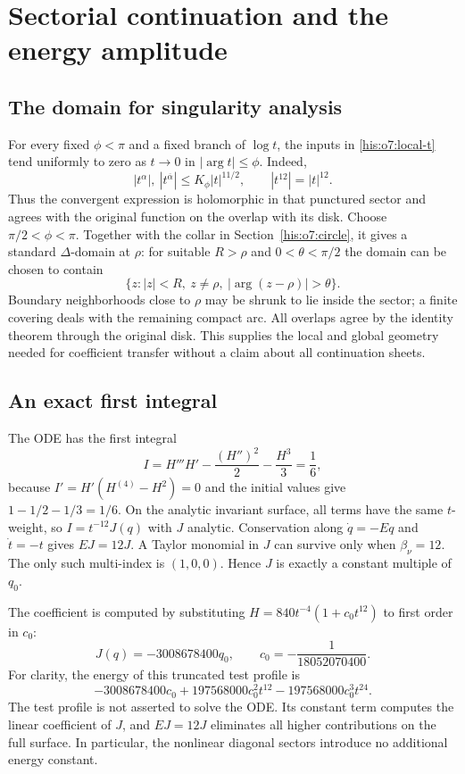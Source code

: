 \documentclass[11pt]{article}
\theoremstyle{remark}\newtheorem{remark}[theorem]{Remark}
\newcommand{\ba}{\overline\alpha}
\numberwithin{equation}{section}
\begin{document}
\section{Sectorial continuation and the energy amplitude}\label{his:o7:sector}
\subsection{The domain for singularity analysis}
For every fixed $\phi<\pi$ and a fixed branch of $\log t$, the
inputs in \eqref{his:o7:local-t} tend uniformly to zero as $t\to0$ in
$|\arg t|\le\phi$. Indeed,
\[
|t^\alpha|,\ |t^{\ba}|\le K_\phi |t|^{11/2},\qquad
|t^{12}|=|t|^{12}.
\]
Thus the convergent expression is holomorphic in that punctured
sector and agrees with the original function on the overlap with
its disk. Choose $\pi/2<\phi<\pi$. Together with the collar in
Section~\ref{his:o7:circle}, it gives a standard $\Delta$-domain at $\rho$:
for suitable $R>\rho$ and $0<\theta<\pi/2$ the domain can be
chosen to contain
\[
\{z:|z|<R,\ z\ne\rho,\ |\arg(z-\rho)|>\theta\}.
\]
Boundary neighborhoods close to $\rho$ may be shrunk to lie inside
the sector; a finite covering deals with the remaining compact arc.
All overlaps agree by the identity theorem through the original disk.
This supplies the local and global geometry needed for coefficient
transfer without a claim about all continuation sheets.

\subsection{An exact first integral}
The ODE has the first integral
\begin{equation}\label{his:o7:energy}
I=H'''H'-\frac{(H'')^2}{2}-\frac{H^3}{3}=\frac16,
\end{equation}
because $I'=H'(H^{(4)}-H^2)=0$ and the initial values give
$1-1/2-1/3=1/6$. On the analytic invariant surface, all terms
have the same $t$-weight, so $I=t^{-12}J(q)$ with $J$ analytic.
Conservation along $\dot q=-Eq$ and $\dot t=-t$ gives
$EJ=12J$. A Taylor monomial in $J$ can survive only when
$\beta_\nu=12$. The only such multi-index is $(1,0,0)$.
Hence $J$ is exactly a constant multiple of $q_0$.

The coefficient is computed by substituting
$H=840t^{-4}(1+c_0t^{12})$ to first order in $c_0$:
\begin{equation}\label{his:o7:amplitude}
J(q)=-3008678400q_0,\qquad
c_0=-\frac1{18052070400}.
\end{equation}
For clarity, the energy of this truncated test profile is
\[
-3008678400c_0+197568000c_0^2t^{12}
-197568000c_0^3t^{24}.
\]
The test profile is not asserted to solve the ODE. Its constant term
computes the linear coefficient of $J$, and $EJ=12J$ eliminates all
higher contributions on the full surface. In particular, the
nonlinear diagonal sectors introduce no additional energy constant.
\end{document}
